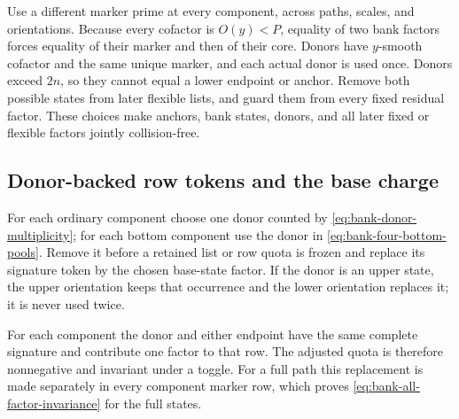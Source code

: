 \documentclass[11pt]{article}
\numberwithin{equation}{section}
\theoremstyle{definition}
\theoremstyle{remark}
\newcommand{\1}{\mathbf 1}
\begin{document}
Use a different marker prime at every component, across paths, scales, and
orientations.  Because every cofactor is \(O(y)<P\), equality of two bank
factors forces equality of their marker and then of their core.  Donors
have \(y\)-smooth cofactor and the same unique marker, and each actual
donor is used once.  Donors exceed \(2n\), so they cannot equal a lower
endpoint or anchor.  Remove both possible states from later flexible
lists, and guard them from every fixed residual factor.  These choices
make anchors, bank states, donors, and all later fixed or flexible factors
jointly collision-free.

\subsection{Donor-backed row tokens and the base charge}
\label{subsec:bank-precharge}

For each ordinary component choose one donor counted by
\eqref{eq:bank-donor-multiplicity}; for each bottom component use the
donor in \eqref{eq:bank-four-bottom-pools}.  Remove it before a retained
list or row quota is frozen and replace its signature token by the chosen
base-state factor.  If the donor is an upper state, the upper orientation
keeps that occurrence and the lower orientation replaces it; it is never
used twice.

For each component the donor and either endpoint have the same complete
signature and contribute one factor to that row.  The adjusted quota is
therefore nonnegative and invariant under a toggle.  For a full path this
replacement is made separately in every component marker row, which proves
\eqref{eq:bank-all-factor-invariance} for the full states.
\end{document}
